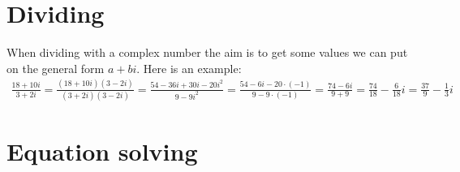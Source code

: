 \section{Dividing}
When dividing with a complex number the aim is to get some values we can put on the general form $a + bi$. Here is an example: \\
\begin{align*}
\frac{18 + 10i}{3 + 2i} =
\frac{(18 + 10i)(3 - 2i)}{(3+2i)(3-2i)} =
\frac{54 - 36i + 30i - 20i^2}{9 - 9i^2} =
\frac{54 - 6i - 20 \cdot (-1)}{9 - 9 \cdot (-1)} =
\frac{74 - 6i}{9 + 9} =
\frac{74}{18} - \frac{6}{18}i =
\frac{37}{9} - \frac{1}{3}i
\end{align*}

\section{Equation solving}